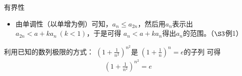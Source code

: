 \documentclass{article}
\begin{document}
有界性
\begin{itemize}
  \item 由单调性（以单增为例）可知，$a_n \leq a_{2n}$，然后用$a_n$表示出$a_{2n} < a + k a_{n} \ (k < 1)$，于是可得
        $a_n < a + k a_n$得出$a_n$的范围。（$\S 3$例1）
\end{itemize}

\begin{zremark}
  利用已知的数列极限的方式：
  $\left(1 + \frac{1}{n^2}\right)^{n^2}$是
  $\left(1 + \frac{1}{n}\right)^{n} = e $的子列
  可得
  \begin{align*}
    \left(1 + \frac{1}{n^2}\right)^{n^2} = e
  \end{align*}
\end{zremark}
\end{document}
